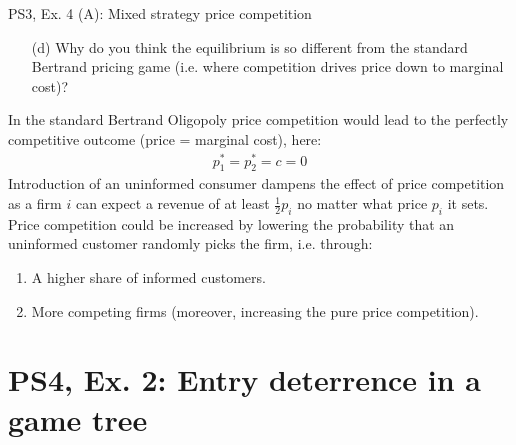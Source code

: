 \begin{frame}{PS3, Ex. 4 (A): Mixed strategy price competition}
    \begin{itemize}
      \item[(d)] Why do you think the equilibrium is so different from the standard Bertrand pricing game (i.e. where competition drives price down to marginal cost)?
    \end{itemize}
    In the standard Bertrand Oligopoly price competition would lead to the perfectly competitive outcome (price = marginal cost), here:
    \begin{align*}
      p_1^{*}=p_2^{*}=c=0
    \end{align*}
    Introduction of an uninformed consumer dampens the effect of price competition as a firm $i$ can expect a revenue of at least $\frac{1}{2}p_i$ no matter what price $p_i$ it sets.\\\medskip
    Price competition could be increased by lowering the probability that an uninformed customer randomly picks the firm, i.e. through:
    \begin{enumerate}
      \item A higher share of informed customers.
      \item More competing firms (moreover, increasing the pure price competition).
    \end{enumerate}
  \vfill\null
\end{frame}


\section{PS4, Ex. 2: Entry deterrence in a game tree}

